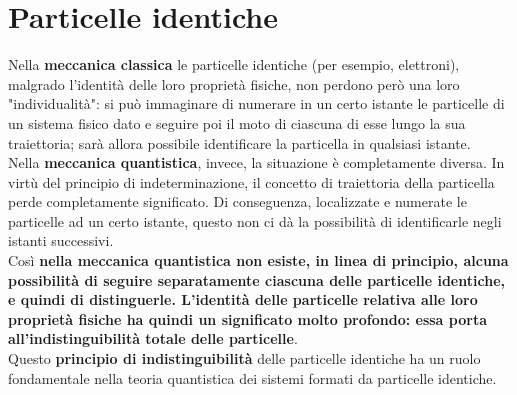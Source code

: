 \documentclass[a4paper,12pt,oneside]{book}
\newcommand*{\myfont}{\fontfamily{ppl}\selectfont}
\begin{document}
\fancypagestyle{plain}{%
\fancyhf{} %
\fancyfoot[C]{\bfseries \myfont{\thepage}} %
\renewcommand{\headrulewidth}{0pt}
\renewcommand{\footrulewidth}{0pt}}

\fancypagestyle{VS}{
\headheight = 15pt
\lhead[\myfont{\textit{\textbf{\thechapter\nouppercase{\leftmark}}}}]{\myfont{\textit{\textbf{\nouppercase{\leftmark}}}}}
\chead[]{}
\rhead[\myfont{\textbf{\thepage}}]{\myfont{\textbf{\thepage}}}

\lfoot[]{}
\cfoot[]{}
\rfoot[]{}
}



\pagestyle{VS}
\setcounter{chapter}{19}
\setcounter{page}{199}
\chapter[Particelle identiche]{Particelle identiche}
Nella \textbf{meccanica classica} le particelle identiche (per esempio, elettroni), malgrado l'identità delle loro proprietà fisiche, non perdono però una loro "individualità": si può immaginare di numerare in un certo istante le particelle di un sistema fisico dato e seguire poi il moto di ciascuna di esse lungo la sua traiettoria; sarà allora possibile identificare la particella in qualsiasi istante.\\ 

Nella \textbf{meccanica quantistica}, invece, la situazione \`e completamente diversa. In virtù del principio di indeterminazione, il concetto di traiettoria della particella perde completamente significato. Di conseguenza, localizzate e numerate le particelle ad un certo istante, questo non ci dà la possibilità di identificarle negli istanti successivi.\\

Cos\`i \textbf{nella meccanica quantistica non esiste, in linea di principio, alcuna possibilità di seguire separatamente ciascuna delle particelle identiche, e quindi di distinguerle. L'identità delle particelle relativa alle loro proprietà fisiche ha quindi un significato molto profondo: essa porta all'indistinguibilità totale delle particelle}.\\

Questo \textbf{principio di indistinguibilità} delle particelle identiche ha un ruolo fondamentale nella teoria quantistica dei sistemi formati da particelle identiche.\\
\end{document}
